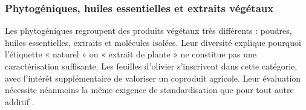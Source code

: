 \subsubsection{Phytogéniques, huiles essentielles et extraits végétaux}

Les phytogéniques regroupent des produits végétaux très différents : poudres, huiles essentielles, extraits et molécules isolées. Leur diversité explique pourquoi l'étiquette « naturel » ou « extrait de plante » ne constitue pas une caractérisation suffisante. Les feuilles d'olivier s'inscrivent dans cette catégorie, avec l'intérêt supplémentaire de valoriser un coproduit agricole. Leur évaluation nécessite néanmoins la même exigence de standardisation que pour tout autre additif \citep{Gadde2017}.
